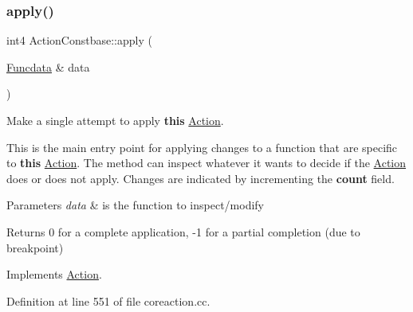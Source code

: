 \subsubsection{\texorpdfstring{apply()}{apply()}}
{\footnotesize\ttfamily int4 Action\+Constbase\+::apply (\begin{DoxyParamCaption}\item[{\mbox{\hyperlink{class_funcdata}{Funcdata}} \&}]{data }\end{DoxyParamCaption})\hspace{0.3cm}{\ttfamily [virtual]}}



Make a single attempt to apply {\bfseries{this}} \mbox{\hyperlink{class_action}{Action}}. 

This is the main entry point for applying changes to a function that are specific to {\bfseries{this}} \mbox{\hyperlink{class_action}{Action}}. The method can inspect whatever it wants to decide if the \mbox{\hyperlink{class_action}{Action}} does or does not apply. Changes are indicated by incrementing the {\bfseries{count}} field. 
\begin{DoxyParams}{Parameters}
{\em data} & is the function to inspect/modify \\
\hline
\end{DoxyParams}
\begin{DoxyReturn}{Returns}
0 for a complete application, -\/1 for a partial completion (due to breakpoint) 
\end{DoxyReturn}


Implements \mbox{\hyperlink{class_action_aac1c3999d6c685b15f5d9765a4d04173}{Action}}.



Definition at line 551 of file coreaction.\+cc.

